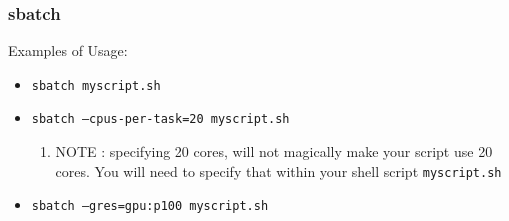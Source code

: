 \documentclass{beamer}
\newcommand{\code}[1]{\colorbox{codegray}{\texttt{#1}}}
\begin{document}
\begin{frame}
\frametitle{sbatch}
Examples of Usage:
\bigskip
\begin{itemize}
    \item \code{sbatch myscript.sh}
    \bigskip
    \pause
    \item \code{sbatch --cpus-per-task=20 myscript.sh}
    \bigskip
    \pause
    \begin{enumerate}
        \item NOTE : specifying 20 cores, will not magically make your script use 20 cores.
                     You will need to specify that within your shell script \code{myscript.sh}
    \end{enumerate}
    \item \code{sbatch --gres=gpu:p100 myscript.sh}
    \bigskip
\end{itemize}
\end{frame}
\end{document}
